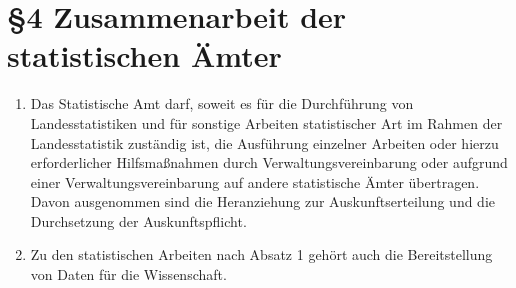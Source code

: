     \section[Zusammenarbeit]{\S4 Zusammenarbeit der statistischen Ämter}
        \begin{enumerate}[label=(\arabic*)]
            \item Das Statistische Amt darf, soweit es für die Durchführung von Landesstatistiken und für sonstige Arbeiten statistischer Art im Rahmen der Landesstatistik zuständig ist, die Ausführung einzelner Arbeiten oder hierzu erforderlicher Hilfsmaßnahmen durch Verwaltungsvereinbarung oder aufgrund einer Verwaltungsvereinbarung auf andere statistische Ämter übertragen. Davon ausgenommen sind die Heranziehung zur Auskunftserteilung und die Durchsetzung der Auskunftspflicht.
            \item Zu den statistischen Arbeiten nach Absatz 1 gehört auch die Bereitstellung von Daten für die Wissenschaft.
        \end{enumerate}
 
